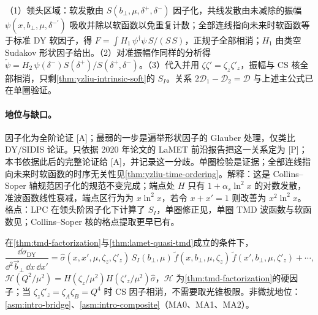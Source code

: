 \begin{proofsketch}
（1）领头区域\cite[第~5~节、图~25]{Liu:2022nnk}：软发散由 $S(b_\perp,\mu,\delta^+,\delta^-)$ 因子化，共线发散由未减除的振幅 $\psi(x,b_\perp,\mu,\delta^{-\prime})$ 吸收并除以软函数以免重复计数；全部连线指向未来时软函数等于标准 DY 软因子，得 $F=\int H_1\,\psi^\dagger\psi\,S/(S\,S)$，正规子全部相消\cite[式~(145)]{Liu:2022nnk}；$H_1$ 由类空 Sudakov 形状因子给出\cite[式~(148)]{Liu:2022nnk}。（2）对准振幅作同样的分析得 $\tilde\psi=H_2\,\psi(\delta^-)S(\delta^+)/S(\delta^+,\delta^-)$\cite[式~(150)]{Liu:2022nnk}。（3）代入并用 $\zeta\zeta'=\zeta_z\zeta'_z$，振幅与 CS 核全部相消，只剩\cref{thm:yzliu-intrinsic-soft}的 $S_I$\cite[式~(151)--(152)]{Liu:2022nnk}。关系 $2\mathcal D_1-\mathcal D_2=\mathcal D$ 与上述主公式已在单圈验证\cite{Ji:2019sxk}。
\end{proofsketch}

\paragraph{地位与缺口。}因子化为全阶论证 [A]；最弱的一步是遍举形状因子的 Glauber 处理，仅类比 DY/SIDIS 论证。只依据 2020 年论文的 LaMET 前沿报告把这一关系定为 [P]；本书依据此后的完整论证\cite[第~5~节]{Liu:2022nnk}给 [A]，并记录这一分歧。单圈检验是证据；全部连线指向未来时软函数的时序无关性见\cref{thm:yzliu-time-ordering}。解释：这是 Collins--Soper 轴规范因子化\cite{CollinsSoper1981}的规范不变完成；端点处 $H$ 只有 $1+\alpha_s\ln^2x$ 的对数发散，准波函数线性衰减，端点区行为为 $x\ln^2x$，若令 $x+x'=1$ 则改善为 $x^2\ln^2x$。格点：LPC 在领头阶因子化下计算了 $S_I$\cite{LatticeParton:2020uhz}，单圈修正见\cite{LatticePartonLPC:2023pdv}，单圈 TMD 波函数与软函数见\cite{Deng:2022gzi}；Collins--Soper 核的格点提取更早已有\cite{Shanahan:2020zxr}。

\begin{proposition}\label{prop:yzliu-dy-quasi}
在\cref{thm:tmd-factorization}与\cref{thm:lamet-quasi-tmd}成立的条件下，
\begin{equation}\label{eq:yzliu-dy-quasi}
\frac{\dd\sigma_{\mathrm{DY}}}{\dd^2\vec b_\perp\,\dd x\,\dd x'}=\hat\sigma(x,x',\mu,\zeta_z,\zeta'_z)\,S_I(b_\perp,\mu)\,\tilde f(x,b_\perp,\mu,\zeta_z)\,\tilde f(x',b_\perp,\mu,\zeta'_z)+\cdots,
\end{equation}
$\mathcal H(Q^2/\mu^2)=H(\zeta_z/\mu^2)H(\zeta'_z/\mu^2)\hat\sigma$，$\mathcal H$ 为\cref{thm:tmd-factorization}的硬因子；当 $\zeta_z\zeta'_z=\zeta_A\zeta_B=Q^4$ 时 CS 因子相消，不需要取光锥极限。非微扰地位：\cref{asm:intro-bridge}、\cref{asm:intro-composite}（MA0、MA1、MA2）。
\end{proposition}

